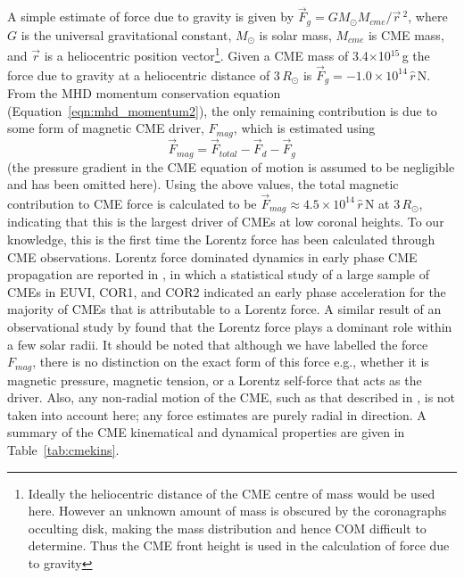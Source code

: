 A simple estimate of force due to gravity is given by $\vec{F}_{g}=GM_{\odot}M_{cme}/\vec{r}\,^2$, where $G$ is the universal gravitational constant, $M_{\odot}$ is solar mass, $M_{cme}$ is CME mass, and $\vec{r}$ is a heliocentric position vector\footnote{Ideally the heliocentric distance of the CME centre of mass would be used here. However an unknown amount of mass is obscured by the coronagraphs occulting disk, making the mass distribution and hence COM difficult to determine. Thus the CME front height is used in the calculation of force due to gravity}. Given a CME mass of 3.4$\times$10$^{15}$\,g the force due to gravity at a heliocentric distance of 3\,$R_{\odot}$ is $\vec{F}_{g}=-1.0\times10^
{14}\,\hat{r}$\,N. From the MHD momentum conservation equation (Equation~\ref{eqn:mhd_momentum2}), the only remaining contribution is due to some form of magnetic CME driver, $F_{mag}$, which is estimated using 
\begin{equation}
\vec{F}_{mag}= \vec{F}_{total}-\vec{F}_{d}-\vec{F}_{g}
\end{equation}
(the pressure gradient in the CME equation of motion is assumed to be negligible and has been omitted here). Using the above values, the total magnetic contribution to CME force is calculated to be $\vec{F}_{mag}\approx4.5\times10^{14}\,\hat{r}$\,N at 3\,$R_{\odot}$, indicating that this is the largest driver of CMEs at low coronal heights. To our knowledge, this is the first time the Lorentz force has been calculated through CME observations. Lorentz force dominated dynamics in early phase CME propagation are reported in \citet{bein2011}, in which a statistical study of a large sample of CMEs in EUVI, COR1, and COR2 indicated an early phase acceleration for the majority of CMEs that is attributable to a Lorentz force.  A similar result of an observational study by \citet{vrs06} found that the Lorentz force plays a dominant role within a few solar radii. It should be noted that although we have labelled the force $F_{mag}$, there is no distinction on the exact form of this force e.g., whether it is magnetic pressure, magnetic tension, or a Lorentz self-force that acts as the driver. Also, any non-radial motion of the CME, such as that described in \citet{byrne2010}, is not taken into account here; any force estimates are purely radial in direction. {\color{black}A summary of the CME kinematical and dynamical properties are given in Table~\ref{tab:cmekins}.}

